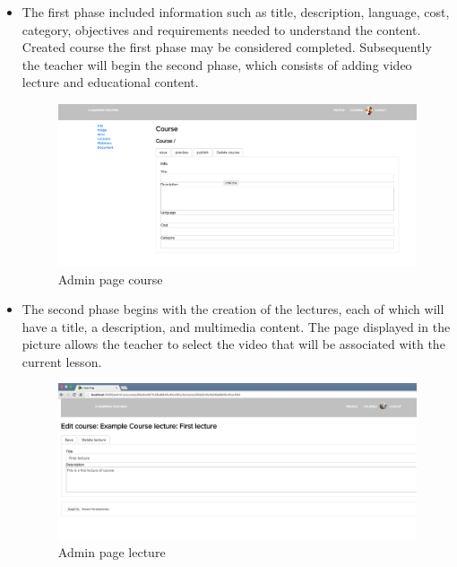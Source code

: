\begin{itemize}
\item The first phase included information such as title, description, language, cost, category, objectives and requirements needed to understand the content. Created course the first phase may be considered completed. Subsequently the teacher will begin the second phase, which consists of adding video lecture and educational content.

\begin{figure}[htb]
 \centering
 \includegraphics[width=1.0\linewidth]{images/chapter6/insert_course_page.png}\hfill
 \caption[Admin page course]{Admin page course}
 \label{fig:fourV}
\end{figure}

\item The second phase begins with the creation of the lectures, each of which will have a title, a description, and multimedia content.
The page displayed in the picture allows the teacher to select the video that will be associated with the current lesson.

\begin{figure}[htb]
 \centering
 \includegraphics[width=1.0\linewidth]{images/chapter6/insert_lecture.png}\hfill
 \caption[Admin page lecture]{Admin page lecture}
 \label{fig:fourV}
\end{figure}

\end{itemize}

